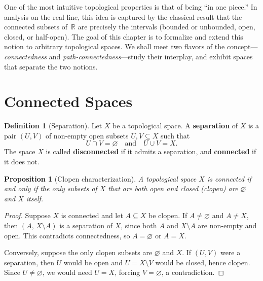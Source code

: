 \documentclass[11pt,a4paper,twoside]{book}
\newtheorem{proposition}[theorem]{Proposition}
\theoremstyle{remark}
\theoremstyle{definition}
\theoremstyle{definition}
\newtheorem{definition}{Definition}[section]
\begin{document}
One of the most intuitive topological properties is that of being
``in one piece.''  In analysis on the real line, this idea is captured
by the classical result that the connected subsets of~$\mathbb{R}$
are precisely the intervals (bounded or unbounded, open, closed,
or half-open).  The goal of this chapter is to formalize and extend
this notion to arbitrary topological spaces.  We shall meet two
flavors of the concept---\emph{connectedness} and
\emph{path-connectedness}---study their interplay, and exhibit
spaces that separate the two notions.

\section{Connected Spaces}\label{sec:connected-spaces}

\begin{definition}[Separation]\label{def:separation}
Let $X$ be a topological space.  A \textbf{separation} of $X$ is
a pair $(U,V)$ of non-empty open subsets $U,V\subseteq X$ such that
\[
   U\cap V=\varnothing \quad\text{and}\quad U\cup V=X.
\]
The space $X$ is called \textbf{disconnected}
if it admits a separation, and \textbf{connected}
if it does not.
\end{definition}

\begin{proposition}[Clopen characterization]\label{prop:clopen-connected}
A topological space $X$ is connected if and only if the only subsets
of $X$ that are both open and closed (clopen) are $\varnothing$
and $X$ itself.
\end{proposition}

\begin{proof}
Suppose $X$ is connected and let $A\subseteq X$ be clopen.  If
$A\neq\varnothing$ and $A\neq X$, then $(A,\,X\setminus A)$ is a
separation of $X$, since both $A$ and $X\setminus A$ are non-empty
and open.  This contradicts connectedness, so $A=\varnothing$ or
$A=X$.

Conversely, suppose the only clopen subsets are $\varnothing$ and $X$.
If $(U,V)$ were a separation, then $U$ would be open and
$U=X\setminus V$ would be closed, hence clopen.  Since $U\neq\varnothing$,
we would need $U=X$, forcing $V=\varnothing$, a contradiction.
\end{proof}
\end{document}
